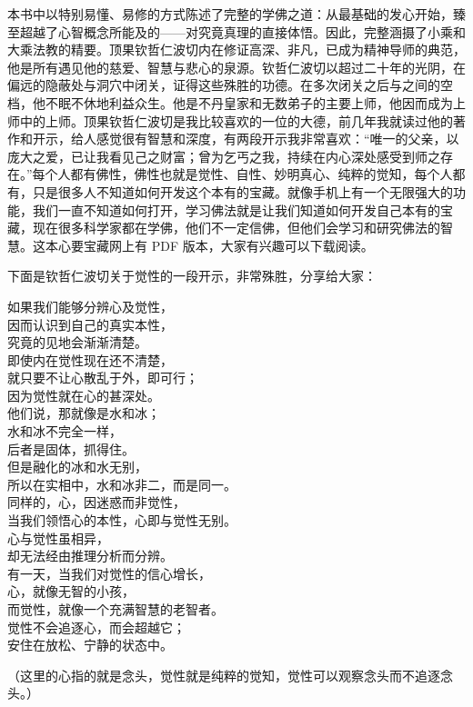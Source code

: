 \begin{book}
    本书中以特别易懂、易修的方式陈述了完整的学佛之道：从最基础的发心开始，臻至超越了心智概念所能及的——对究竟真理的直接体悟。因此，完整涵摄了小乘和大乘法教的精要。顶果钦哲仁波切内在修证高深、非凡，已成为精神导师的典范，他是所有遇见他的慈爱、智慧与悲心的泉源。钦哲仁波切以超过二十年的光阴，在偏远的隐蔽处与洞穴中闭关，证得这些殊胜的功德。在多次闭关之后与之间的空档，他不眠不休地利益众生。他是不丹皇家和无数弟子的主要上师，他因而成为上师中的上师。顶果钦哲仁波切是我比较喜欢的一位的大德，前几年我就读过他的著作和开示，给人感觉很有智慧和深度，有两段开示我非常喜欢：“唯一的父亲，以庞大之爱，已让我看见己之财富；曾为乞丐之我，持续在内心深处感受到师之存在。”每个人都有佛性，佛性也就是觉性、自性、妙明真心、纯粹的觉知，每个人都有，只是很多人不知道如何开发这个本有的宝藏。就像手机上有一个无限强大的功能，我们一直不知道如何打开，学习佛法就是让我们知道如何开发自己本有的宝藏，现在很多科学家都在学佛，他们不一定信佛，但他们会学习和研究佛法的智慧。这本心要宝藏网上有 PDF 版本，大家有兴趣可以下载阅读。

    下面是钦哲仁波切关于觉性的一段开示，非常殊胜，分享给大家：

    \begin{multicols}{2}
        \begin{center}
            如果我们能够分辨心及觉性， \\ 因而认识到自己的真实本性， \\ 究竟的见地会渐渐清楚。 \\ 即使内在觉性现在还不清楚， \\ 就只要不让心散乱于外，即可行； \\ 因为觉性就在心的甚深处。 \\ 他们说，那就像是水和冰； \\ 水和冰不完全一样， \\ 后者是固体，抓得住。 \\ 但是融化的冰和水无别， \\ 所以在实相中，水和冰非二，而是同一。 \\ 同样的，心，因迷惑而非觉性， \\ 当我们领悟心的本性，心即与觉性无别。 \\ 心与觉性虽相异， \\ 却无法经由推理分析而分辨。 \\ 有一天，当我们对觉性的信心增长， \\ 心，就像无智的小孩， \\ 而觉性，就像一个充满智慧的老智者。 \\ 觉性不会追逐心，而会超越它； \\ 安住在放松、宁静的状态中。
        \end{center}
    \end{multicols}

    （这里的心指的就是念头，觉性就是纯粹的觉知，觉性可以观察念头而不追逐念头。）
\end{book}
